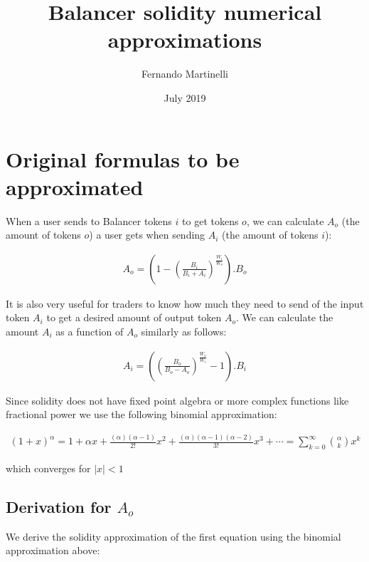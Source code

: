 \documentclass[11pt]{amsart}
\title{Balancer solidity numerical approximations}
\author{Fernando Martinelli}
\date{July 2019}                                 %
\begin{document}
\maketitle
\section{Original formulas to be approximated}

When a user sends to Balancer tokens $i$ to get tokens $o$, we can calculate $A_o$ (the amount of tokens $o$) a user gets when sending $A_i$ (the amount of tokens $i$):

\begin{equation}
\begin{gathered}
A_o = \left(1 - \left(\frac{B_i}{B_i+A_i}\right)^{\frac{W_i}{W_o}}\right).B_o
\end{gathered}
\end{equation}

It is also very useful for traders to know how much they need to send of the input token $A_i$ to get a desired amount of output token $A_o$. We can calculate the amount $A_i$ as a function of $A_o$ similarly as follows:

\begin{equation}
\begin{gathered}
A_i = \left(\left(\frac{B_o}{B_o-A_o}\right)^{\frac{W_o}{W_i}}-1\right).B_i
\end{gathered}
\end{equation}

Since solidity does not have fixed point algebra or more complex functions like fractional power we use the following binomial approximation:

\begin{equation}
\begin{gathered}
\left(1+x\right)^\alpha=1+\alpha x+\frac{(\alpha)(\alpha-1)}{2!}x^2+
\frac{(\alpha)(\alpha-1)(\alpha-2)}{3!}x^3+
\cdots = \sum_{k=0}^{\infty}{\alpha \choose k}x^k
\end{gathered}
\end{equation}

which converges for ${|x| < 1}$
\\

\subsection{Derivation for $A_o$}
We derive the solidity approximation of the first equation using the binomial approximation above:
\end{document}
